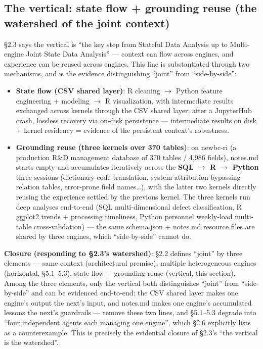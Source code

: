 \documentclass[11pt]{article}
\begin{document}
\subsection{The vertical: state flow + grounding reuse (the watershed of the joint context)}

\S{}2.3 says the vertical is ``the key step from Stateful Data Analysis up to Multi-engine Joint State Data Analysis'' --- context can flow across engines, and experience can be reused across engines. This line is substantiated through two mechanisms, and is the evidence distinguishing ``joint'' from ``side-by-side'':

\begin{itemize}
\item
  \textbf{State flow (CSV shared layer)}: R cleaning $\rightarrow$ Python feature engineering + modeling $\rightarrow$ R visualization, with intermediate results exchanged across kernels through the CSV shared layer; after a JupyterHub crash, lossless recovery via on-disk persistence --- intermediate results on disk + kernel residency = evidence of the persistent context's robustness.
\item
  \textbf{Grounding reuse (three kernels over 370 tables)}: on newbc-ri (a production R\&D management database of 370 tables / 4,986 fields), notes.md starts empty and accumulates iteratively across the \textbf{SQL $\rightarrow$ R $\rightarrow$ Python} three sessions (dictionary-code translation, system attribution bypassing relation tables, error-prone field names\ldots), with the latter two kernels directly reusing the experience settled by the previous kernel. The three kernels run deep analyses end-to-end (SQL multi-dimensional defect classification, R ggplot2 trends + processing timeliness, Python personnel weekly-load multi-table cross-validation) --- the same schema.json + notes.md resource files are shared by three engines, which ``side-by-side'' cannot do.
\end{itemize}

\textbf{Closure (responding to \S{}2.3's watershed)}: \S{}2.2 defines ``joint'' by three elements --- same context (architectural premise), multiple heterogeneous engines (horizontal, \S{}5.1--5.3), state flow + grounding reuse (vertical, this section). Among the three elements, only the vertical both distinguishes ``joint'' from ``side-by-side'' and can be evidenced end-to-end: the CSV shared layer makes one engine's output the next's input, and notes.md makes one engine's accumulated lessons the next's guardrails --- remove these two lines, and \S{}5.1--5.3 degrade into ``four independent agents each managing one engine'', which \S{}2.6 explicitly lists as a counterexample. This is precisely the evidential closure of \S{}2.3's ``the vertical is the watershed''.
\end{document}
